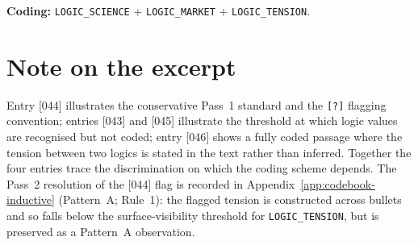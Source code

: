 \textbf{Coding:} \texttt{LOGIC\_SCIENCE} + \texttt{LOGIC\_MARKET} +
\texttt{LOGIC\_TENSION}.

\section*{Note on the excerpt}

Entry [044] illustrates the conservative Pass~1 standard and the
\texttt{[?]} flagging convention; entries [043] and [045] illustrate
the threshold at which logic values are recognised but not coded;
entry [046] shows a fully coded passage where the tension between two
logics is stated in the text rather than inferred. Together the four
entries trace the discrimination on which the coding scheme depends.
The Pass~2 resolution of the [044] flag is recorded in
Appendix~\ref{app:codebook-inductive} (Pattern~A; Rule~1): the flagged
tension is constructed across bullets and so falls below the
surface-visibility threshold for \texttt{LOGIC\_TENSION}, but is
preserved as a Pattern~A observation.

